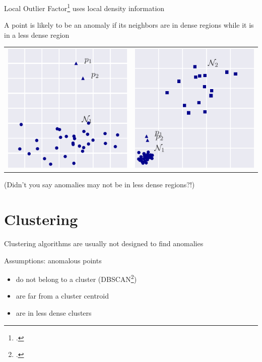 \documentclass{beamer}
\begin{document}
  \begin{frame}{Local Outlier Factor\footcite{Breunig1999} uses local density information}
    
    A point is likely to be an anomaly if its neighbors are in dense regions while it is in a less dense region
    \centering
    \begin{tabular}{c|c}
    \includegraphics[width=.45\textwidth]{figs/hard1_dist.pdf} &
    \includegraphics[width=.45\textwidth]{figs/hard2_dist.pdf}
    \end{tabular}
    (Didn't you say anomalies may not be in less dense regions?!)
    
  \end{frame}


  \section{Clustering}

  \begin{frame}{Clustering algorithms are usually not designed to find anomalies}

    Assumptions: anomalous points
    \begin{itemize}
    \item do not belong to a cluster (DBSCAN\footcite{Ester1996})
    \item are far from a cluster centroid %
    \item are in less dense clusters
    \end{itemize}

  \end{frame}
\end{document}
